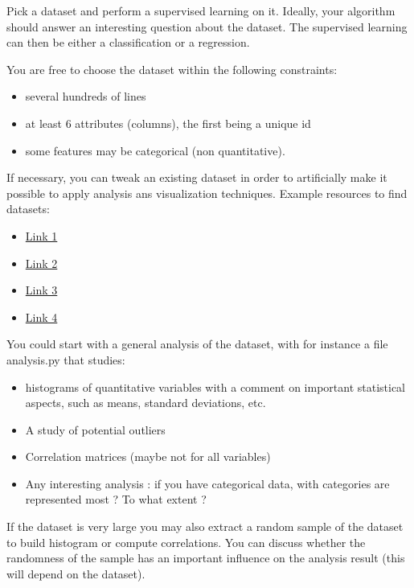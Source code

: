\documentclass[10pt, a4paper]{article}
\begin{document}
\begin{Problem}
    Pick a dataset and perform a supervised learning on it. Ideally, your algorithm should answer an interesting question about the dataset. The supervised learning can then be either a classification or a regression.

    You are free to choose the dataset within the following constraints:
    \begin{itemize}
        \item several hundreds of lines
        \item at least 6 attributes (columns), the first being a unique id
        \item some features may be categorical (non quantitative).
    \end{itemize}

    If necessary, you can tweak an existing dataset in order to artificially make it possible to apply analysis ans visualization techniques. Example resources to find datasets:
    \begin{itemize}
        \item \href{https://en.wikipedia.org/wiki/List_of_datasets_for_machine-learning_research}{Link 1}
        \item \href{https://perso.telecom-paristech.fr/eagan/class/igr204/datasets}{Link 2}
        \item \href{https://github.com/awesomedata/awesome-public-datasets}{Link 3}
        \item \href{https://www.kaggle.com/datasets}{Link 4}
    \end{itemize}

    You could start with a general analysis of the dataset, with for instance a file analysis.py that studies:
    \begin{itemize}
        \item histograms of quantitative variables with a comment on important statistical aspects, such as means, standard deviations, etc.
        \item A study of potential outliers
        \item Correlation matrices (maybe not for all variables)
        \item Any interesting analysis : if you have categorical data, with categories are represented most ? To what extent ?
    \end{itemize}

    If the dataset is very large you may also extract a random sample of the dataset to build histogram or compute correlations. You can discuss whether the randomness of the sample has an important influence on the analysis result (this will depend on the dataset).


\end{Problem}
\end{document}
